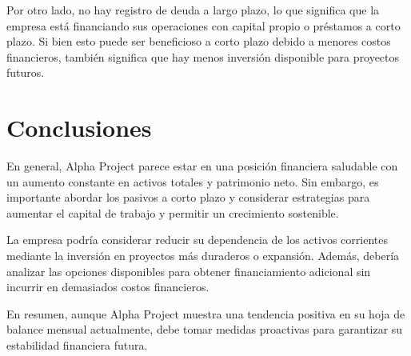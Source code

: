 Por otro lado, no hay registro de deuda a largo plazo, lo que significa que la empresa está financiando sus operaciones con capital propio o préstamos a corto plazo. Si bien esto puede ser beneficioso a corto plazo debido a menores costos financieros, también significa que hay menos inversión disponible para proyectos futuros.

\section{Conclusiones}

En general, Alpha Project parece estar en una posición financiera saludable con un aumento constante en activos totales y patrimonio neto. Sin embargo, es importante abordar los pasivos a corto plazo y considerar estrategias para aumentar el capital de trabajo y permitir un crecimiento sostenible.

La empresa podría considerar reducir su dependencia de los activos corrientes mediante la inversión en proyectos más duraderos o expansión. Además, debería analizar las opciones disponibles para obtener financiamiento adicional sin incurrir en demasiados costos financieros.

En resumen, aunque Alpha Project muestra una tendencia positiva en su hoja de balance mensual actualmente, debe tomar medidas proactivas para garantizar su estabilidad financiera futura.